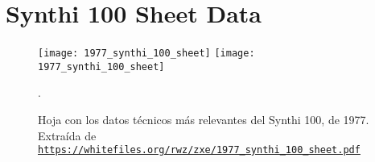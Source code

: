  \chapter[Synthi 100 sheet]{Synthi 100 Sheet Data}



\begin{figure}
	\centering
	\texttt{[image: 1977\_synthi\_100\_sheet]}
	\texttt{[image: 1977\_synthi\_100\_sheet]}
	\caption[]{Hoja con los datos técnicos más relevantes del Synthi 100, de 1977. Extraída de\\ \href{https://whitefiles.org/rwz/zxe/1977\_synthi\_100\_sheet.pdf}{\texttt{https://whitefiles.org/rwz/zxe/1977\_synthi\_100\_sheet.pdf}}}.
	\label{fig:synthi100_sheet}
\end{figure}